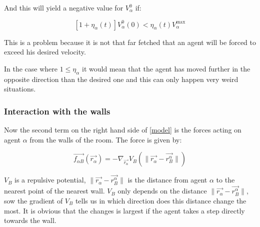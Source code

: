 \begin{itemize}
And this will yield a negative value for $V_{\alpha}^{0}$ if: 

\begin{equation}
\left[ 1 + \eta_{\alpha} \left( t \right) \right] 
V_{\alpha}^{0} \left( 0 \right) < \eta_{\alpha} \left( t \right)V_{\alpha}^{\text{max}} 
\end{equation}

This is a problem because it is not that far fetched that an agent will be 
forced to exceed his desired velocity.

In the case where $1 \leq \eta_{\alpha}$ it would mean that the agent has moved 
further in the opposite direction than the desired one and this can only happen very 
weird situations.
\end{itemize}


\subsubsection{Interaction with the walls}
Now the second term on the right hand side of \eqref{model} is the forces acting on agent 
$\alpha$ from the walls of the room. The force is given by:

\begin{equation}
    \vec{f_{\alpha B}} \left( \vec{r_{\alpha}} \right) =
    - \nabla_{\vec{r_{\alpha}}} V_{B}
    \left( \| \vec{r_{\alpha}} - \vec{r_{B}^{\alpha}} \| \right)
\end{equation}

$V_B$ is a repulsive potential, $ \| \vec{r_{\alpha}} - \vec{r_{B}^{\alpha}} \|$ is the distance 
from agent $\alpha$ to the nearest point of the nearest wall. $V_B$ only depends on the distance $ \| \vec{r_{\alpha}} - \vec{r_{B}^{\alpha}} \|$, sow the gradient of $V_B$ tells us in which direction does this distance change the most. It is obvious that the changes is largest if the agent takes a step directly towards the wall.

